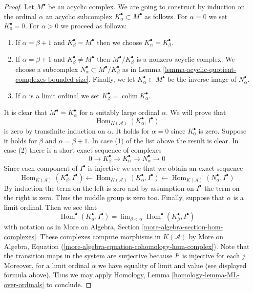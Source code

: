 \documentclass{stacks-project}
\theoremstyle{plain}
\theoremstyle{definition}
\theoremstyle{remark}
\numberwithin{equation}{subsection}
\def\lim{\mathop{\mathrm{lim}}\nolimits}
\def\colim{\mathop{\mathrm{colim}}\nolimits}
\def\Hom{\mathop{\mathrm{Hom}}\nolimits}
\begin{document}
\begin{proof}
Let $M^\bullet$ be an acyclic complex. We are going to construct by
induction on the ordinal $\alpha$ an acyclic subcomplex
$K_\alpha^\bullet \subset M^\bullet$ as follows.
For $\alpha = 0$ we set $K_0^\bullet = 0$. For $\alpha > 0$
we proceed as follows:
\begin{enumerate}
\item If $\alpha = \beta + 1$ and $K_\beta^\bullet = M^\bullet$
then we choose $K_\alpha^\bullet = K_\beta^\bullet$.
\item If $\alpha = \beta + 1$ and $K_\beta^\bullet \not = M^\bullet$
then $M^\bullet/K_\beta^\bullet$ is a nonzero acyclic complex.
We choose a subcomplex $N_\alpha^\bullet \subset M^\bullet/K_\beta^\bullet$
as in Lemma \ref{lemma-acyclic-quotient-complexes-bounded-size}.
Finally, we let $K_\alpha^\bullet \subset M^\bullet$
be the inverse image of $N_\alpha^\bullet$.
\item If $\alpha$ is a limit ordinal we set
$K_\beta^\bullet = \colim K_\alpha^\bullet$.
\end{enumerate}
It is clear that $M^\bullet = K_\alpha^\bullet$ for a suitably large
ordinal $\alpha$. We will prove that
$$
\Hom_{K(\mathcal{A})}(K_\alpha^\bullet, I^\bullet)
$$
is zero by transfinite induction on $\alpha$. It holds for $\alpha = 0$
since $K_0^\bullet$ is zero. Suppose it holds for $\beta$ and
$\alpha = \beta + 1$. In case (1) of the list above the result is clear.
In case (2) there is a short exact sequence of complexes
$$
0 \to K_\beta^\bullet \to K_\alpha^\bullet \to N_\alpha^\bullet \to 0
$$
Since each component of $I^\bullet$ is injective we see that we obtain
an exact sequence
$$
\Hom_{K(\mathcal{A})}(K_\beta^\bullet, I^\bullet) \leftarrow
\Hom_{K(\mathcal{A})}(K_\alpha^\bullet, I^\bullet) \leftarrow
\Hom_{K(\mathcal{A})}(N_\alpha^\bullet, I^\bullet)
$$
By induction the term on the left is zero and by assumption on $I^\bullet$
the term on the right is zero. Thus the middle group is zero too.
Finally, suppose that $\alpha$ is a limit ordinal. Then we see that
$$
\Hom^\bullet(K_\alpha^\bullet, I^\bullet) =
\lim_{\beta < \alpha} \Hom^\bullet(K_\beta^\bullet, I^\bullet)
$$
with notation as in
More on Algebra, Section \ref{more-algebra-section-hom-complexes}.
These complexes compute morphisms in $K(\mathcal{A})$ by
More on Algebra, Equation
(\ref{more-algebra-equation-cohomology-hom-complex}).
Note that the transition maps in the system are surjective
because $I^j$ is injective for each $j$. Moreover, for a limit
ordinal $\alpha$ we have equality of limit and value
(see displayed formula above). Thus we may apply
Homology, Lemma \ref{homology-lemma-ML-over-ordinals}
to conclude.
\end{proof}
\end{document}
